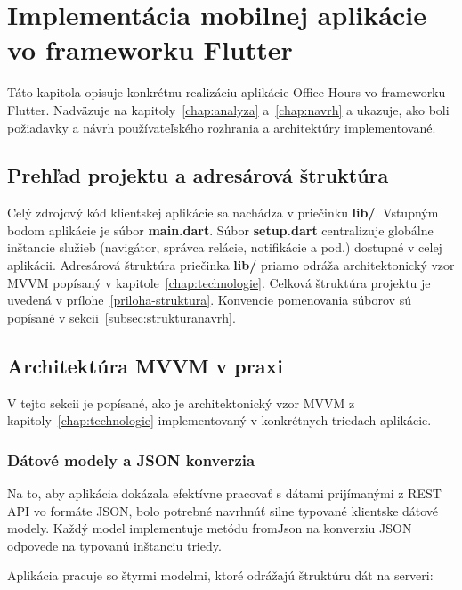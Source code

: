 \chapter{Implementácia mobilnej aplikácie vo frameworku Flutter}
\label{chap:implementacia}
Táto kapitola opisuje konkrétnu realizáciu aplikácie Office Hours vo frameworku Flutter. Nadväzuje na kapitoly~\ref{chap:analyza} a~\ref{chap:navrh} a ukazuje, ako boli požiadavky a návrh používateľského rozhrania a architektúry implementované.

\section{Prehľad projektu a adresárová štruktúra}
\label{sec:impl-struktura}

Celý zdrojový kód klientskej aplikácie sa nachádza v priečinku \textbf{lib/}.
Vstupným bodom aplikácie je súbor \textbf{main.dart}. Súbor \textbf{setup.dart} centralizuje globálne
inštancie služieb (navigátor, správca relácie, notifikácie a pod.)
dostupné v celej aplikácii. Adresárová štruktúra priečinka \textbf{lib/} priamo odráža
architektonický vzor MVVM popísaný v kapitole~\ref{chap:technologie}. Celková štruktúra projektu
je uvedená v prílohe~\ref{priloha-struktura}.
Konvencie pomenovania súborov sú popísané v sekcii~\ref{subsec:strukturanavrh}.

\section{Architektúra MVVM v praxi}
\label{sec:impl-mvvm}
V tejto sekcii je popísané, ako je architektonický vzor MVVM z kapitoly~\ref{chap:technologie} implementovaný v konkrétnych triedach aplikácie.

\subsection{Dátové modely a JSON konverzia}
Na to, aby aplikácia dokázala efektívne pracovať
s dátami prijímanými z REST API vo formáte JSON, bolo potrebné navrhnúť
silne typované klientske dátové modely. Každý model implementuje metódu fromJson na konverziu JSON odpovede na typovanú inštanciu triedy.

Aplikácia pracuje so štyrmi modelmi, ktoré odrážajú štruktúru dát na serveri:

